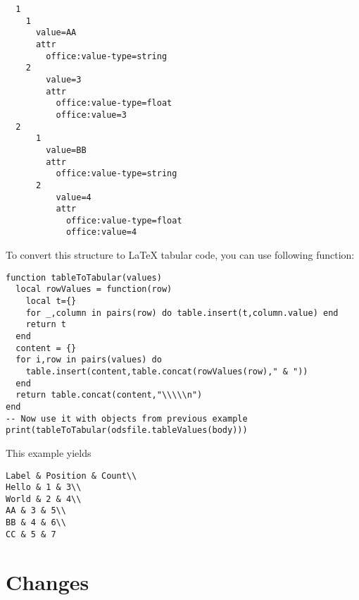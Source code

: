 \documentclass{ltxdoc}
\begin{document}
\begin{verbatim}
  1
    1
      value=AA
      attr
        office:value-type=string
    2
        value=3
        attr
          office:value-type=float
          office:value=3
  2
      1
        value=BB
        attr
          office:value-type=string
      2
          value=4
          attr
            office:value-type=float
            office:value=4
\end{verbatim}

To convert this structure to \LaTeX{} tabular code, you can use following function:

\begin{verbatim}
function tableToTabular(values)
  local rowValues = function(row)
    local t={} 
    for _,column in pairs(row) do table.insert(t,column.value) end
    return t
  end
  content = {}   
  for i,row in pairs(values) do
    table.insert(content,table.concat(rowValues(row)," & "))
  end
  return table.concat(content,"\\\\\n")
end
-- Now use it with objects from previous example
print(tableToTabular(odsfile.tableValues(body)))
\end{verbatim}  

This example yields

\begin{verbatim}
Label & Position & Count\\
Hello & 1 & 3\\
World & 2 & 4\\
AA & 3 & 5\\
BB & 4 & 6\\
CC & 5 & 7
\end{verbatim}



\section{Changes}
\end{document}
